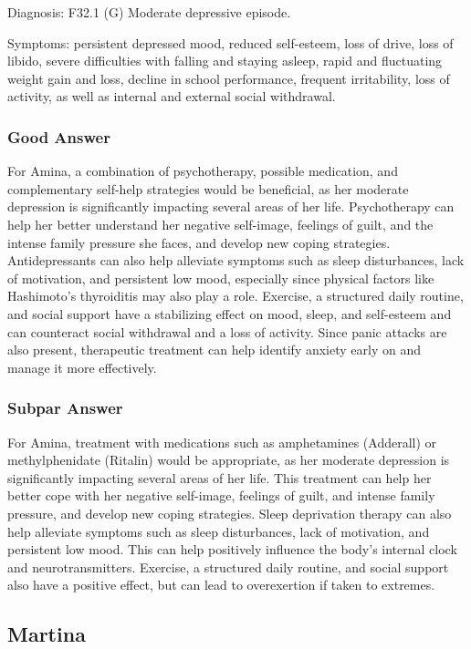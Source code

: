 Diagnosis: F32.1 (G) Moderate depressive episode.

Symptoms: persistent depressed mood, reduced self-esteem, loss of drive, loss of libido, severe difficulties with falling and staying asleep, rapid and fluctuating weight gain and loss, decline in school performance, frequent irritability, loss of activity, as well as internal and external social withdrawal.
\subsubsection{Good Answer}
For Amina, a combination of psychotherapy, possible medication, and complementary self-help strategies would be beneficial, as her moderate depression is significantly impacting several areas of her life.
Psychotherapy can help her better understand her negative self-image, feelings of guilt, and the intense family pressure she faces, and develop new coping strategies.
Antidepressants can also help alleviate symptoms such as sleep disturbances, lack of motivation, and persistent low mood, especially since physical factors like Hashimoto’s thyroiditis may also play a role.
Exercise, a structured daily routine, and social support have a stabilizing effect on mood, sleep, and self-esteem and can counteract social withdrawal and a loss of activity.
Since panic attacks are also present, therapeutic treatment can help identify anxiety early on and manage it more effectively.
\subsubsection{Subpar Answer}
For Amina, treatment with medications such as amphetamines (Adderall) or methylphenidate (Ritalin) would be appropriate, as her moderate depression is significantly impacting several areas of her life.
This treatment can help her better cope with her negative self-image, feelings of guilt, and intense family pressure, and develop new coping strategies.
Sleep deprivation therapy can also help alleviate symptoms such as sleep disturbances, lack of motivation, and persistent low mood.
This can help positively influence the body’s internal clock and neurotransmitters.
Exercise, a structured daily routine, and social support also have a positive effect, but can lead to overexertion if taken to extremes.

\subsection{Martina \autocite[\#tab\_fallbeispiel]{theraphysia_mentale_gesundheit}}
\label{app:MartinaFull}
